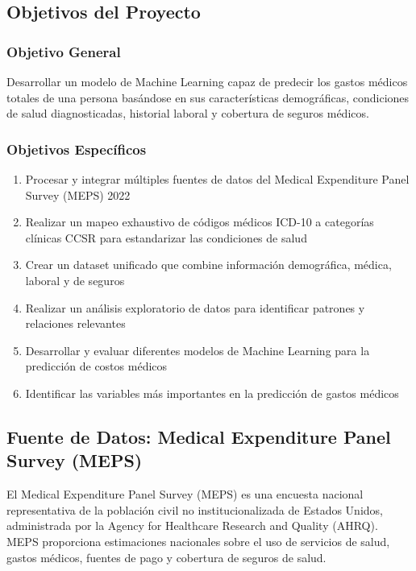 \documentclass[12pt,a4paper]{article}
\begin{document}
\subsection{Objetivos del Proyecto}

\subsubsection{Objetivo General}
Desarrollar un modelo de Machine Learning capaz de predecir los gastos médicos totales de una persona basándose en sus características demográficas, condiciones de salud diagnosticadas, historial laboral y cobertura de seguros médicos.

\subsubsection{Objetivos Específicos}
\begin{enumerate}
    \item Procesar y integrar múltiples fuentes de datos del Medical Expenditure Panel Survey (MEPS) 2022
    \item Realizar un mapeo exhaustivo de códigos médicos ICD-10 a categorías clínicas CCSR para estandarizar las condiciones de salud
    \item Crear un dataset unificado que combine información demográfica, médica, laboral y de seguros
    \item Realizar un análisis exploratorio de datos para identificar patrones y relaciones relevantes
    \item Desarrollar y evaluar diferentes modelos de Machine Learning para la predicción de costos médicos
    \item Identificar las variables más importantes en la predicción de gastos médicos
\end{enumerate}

\subsection{Fuente de Datos: Medical Expenditure Panel Survey (MEPS)}

El Medical Expenditure Panel Survey (MEPS) es una encuesta nacional representativa de la población civil no institucionalizada de Estados Unidos, administrada por la Agency for Healthcare Research and Quality (AHRQ). MEPS proporciona estimaciones nacionales sobre el uso de servicios de salud, gastos médicos, fuentes de pago y cobertura de seguros de salud.
\end{document}
